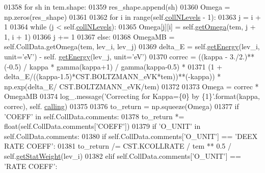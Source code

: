 \begin{DoxyCode}
01358                 \textcolor{keywordflow}{for} sh \textcolor{keywordflow}{in} tem.shape:
01359                     res\_shape.append(sh)
01360                 Omega = np.zeros(res\_shape)
01361         
01362                 \textcolor{keywordflow}{for} i \textcolor{keywordflow}{in} range(self.\hyperlink{classpyneb_1_1core_1_1pynebcore_1_1_atom_a8beaa0244d575054b3e2748a5e00d8db}{collNLevels} - 1):
01363                     j = i + 1
01364                     \textcolor{keywordflow}{while} (j < self.\hyperlink{classpyneb_1_1core_1_1pynebcore_1_1_atom_a8beaa0244d575054b3e2748a5e00d8db}{collNLevels}):
01365                         Omega[j][i] = self.\hyperlink{classpyneb_1_1core_1_1pynebcore_1_1_atom_ae133eed382e284df01f2183da341534b}{getOmega}(tem, j + 1, i + 1)
01366                         j += 1
01367             \textcolor{keywordflow}{else}:
01368                 OmegaMB = self.CollData.getOmega(tem, lev\_i, lev\_j)
01369                 delta\_E = self.\hyperlink{classpyneb_1_1core_1_1pynebcore_1_1_atom_a9940acb2999e864edf9761d822e65d7f}{getEnergy}(lev\_i, unit=\textcolor{stringliteral}{'eV'}) - self.
      \hyperlink{classpyneb_1_1core_1_1pynebcore_1_1_atom_a9940acb2999e864edf9761d822e65d7f}{getEnergy}(lev\_j, unit=\textcolor{stringliteral}{'eV'})
01370                 correc = ((kappa - 3./2.)**(-0.5) / kappa * gamma(kappa+1) / gamma(kappa-0.5) * 
01371                           (1 + delta\_E/((kappa-1.5)*CST.BOLTZMANN\_eVK*tem))**(-kappa)) * np.exp(delta\_E/
      CST.BOLTZMANN\_eVK/tem)
01372     
01373                 Omega = correc * OmegaMB
01374                 log\_.message(\textcolor{stringliteral}{'Correcting for Kappa=\{0\} by \{1\}'}.format(kappa, correc), self.
      \hyperlink{classpyneb_1_1core_1_1pynebcore_1_1_atom_a373b7735acf4f528b54bddf373ad67a1}{calling})
01375 
01376             to\_return = np.squeeze(Omega)
01377         \textcolor{keywordflow}{if} \textcolor{stringliteral}{'COEFF'} \textcolor{keywordflow}{in} self.CollData.comments:
01378             to\_return *= float(self.CollData.comments[\textcolor{stringliteral}{'COEFF'}])
01379         \textcolor{keywordflow}{if} \textcolor{stringliteral}{'O\_UNIT'} \textcolor{keywordflow}{in} self.CollData.comments:
01380             \textcolor{keywordflow}{if} self.CollData.comments[\textcolor{stringliteral}{'O\_UNIT'}] == \textcolor{stringliteral}{'DEEX RATE COEFF'}:
01381                 to\_return /= CST.KCOLLRATE / tem ** 0.5 / self.\hyperlink{classpyneb_1_1core_1_1pynebcore_1_1_atom_a0f2483487115f19556586b9e422bd5fb}{getStatWeight}(lev\_i)
01382             \textcolor{keywordflow}{elif} self.CollData.comments[\textcolor{stringliteral}{'O\_UNIT'}] == \textcolor{stringliteral}{'RATE COEFF'}:

\end{DoxyCode}
